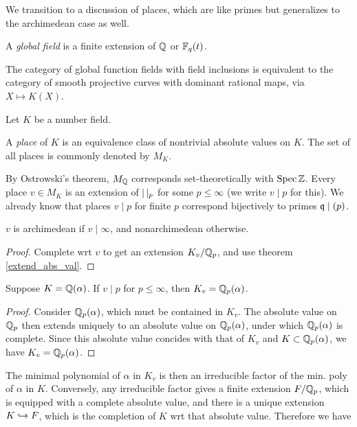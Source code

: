 \documentclass[11pt]{amsart}
\begin{document}
We transition to a discussion of places, which are like primes but generalizes to the archimedean case as well.

\begin{defn}
A \emph{global field} is a finite extension of $\mathbb{Q}$ or $\mathbb{F}_q(t)$.
\end{defn}

\begin{thm}
    The category of global function fields with field inclusions is equivalent to the category of smooth projective curves with dominant rational maps, via $X\mapsto K(X)$.
\end{thm}


Let $K$ be a number field.

\begin{defn}
A \emph{place} of $K$ is an equivalence class of nontrivial absolute values on $K$. The set of all places is commonly denoted by $M_K$.
\end{defn}


By Ostrowski's theorem, $M_{\mathbb{Q}}$ corresponds set-theoretically with $\operatorname{Spec} \mathbb{Z}$. Every place $v\in M_K$ is an extension of $|\thinspace|_p$ for some $p\le \infty$ (we write $v\mid p$ for this). We already know that places $v\mid p$ for finite $p$ correspond bijectively to primes $\mathfrak{q}\mid (p)$.

\begin{prop}
$v$ is archimedean if $v\mid \infty$, and nonarchimedean otherwise.
\end{prop}


\begin{proof}
Complete wrt $v$ to get an extension $K_v/\mathbb{Q}_p$, and use theorem \ref{extend_abs_val}.
\end{proof}


\begin{lem}
Suppose $K = \mathbb{Q}(\alpha)$. If $v\mid p$ for $p\le \infty$, then $K_v = \mathbb{Q}_p(\alpha)$.
\end{lem}

\begin{proof}
Consider $\mathbb{Q}_p(\alpha)$, which must be contained in $K_v$. The absolute value on $\mathbb{Q}_p$ then extends uniquely to an absolute value on $\mathbb{Q}_p(\alpha)$, under which $\mathbb{Q}_p(\alpha)$ is complete. Since this absolute value concides with that of $K_v$ and $K\subset \mathbb{Q}_p(\alpha)$, we have $K_v = \mathbb{Q}_p(\alpha)$.
\end{proof}


The minimal polynomial of $\alpha$ in $K_v$ is then an irreducible factor of the min. poly of $\alpha$ in $K$. Conversely, any irreducible factor gives a finite extension $F/\mathbb{Q}_p$, which is equipped with a complete absolute value, and there is a unique extension $K\hookrightarrow F$, which is the completion of $K$ wrt that absolute value. Therefore we have
\end{document}
